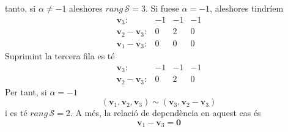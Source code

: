 \begin{solucio}
tanto, si $\alpha \neq -1$ aleshores $rang\,\mathcal{S}=3$. Si fuese $\alpha
=-1$, aleshores tindríem%
\begin{equation*}
\begin{array}{rrrr}
\mathbf{v}_{3}: & -1 & -1 & -1 \\
\mathbf{v}_{2}-\mathbf{v}_{3}: & 0 & 2 & 0 \\
\mathbf{v}_{1}-\mathbf{v}_{3}: & 0 & 0 & 0%
\end{array}%
\end{equation*}%
Suprimint la tercera fila es té%
\begin{equation*}
\begin{array}{rrrr}
\mathbf{v}_{3}: & -1 & -1 & -1 \\
\mathbf{v}_{2}-\mathbf{v}_{3}: & 0 & 2 & 0%
\end{array}%
\end{equation*}%
Per tant, si $\alpha =-1$
\begin{equation*}
(\mathbf{v}_{1},\mathbf{v}_{2},\mathbf{v}_{3})\sim (\mathbf{v}_{3},\mathbf{v}%
_{2}-\mathbf{v}_{3})
\end{equation*}%
i es té $rang\,\mathcal{S}=2$. A més, la relació de dependència
en aquest cas és%
\begin{equation*}
\mathbf{v}_{1}-\mathbf{v}_{3}=\mathbf{0}
\end{equation*}
\end{solucio}

